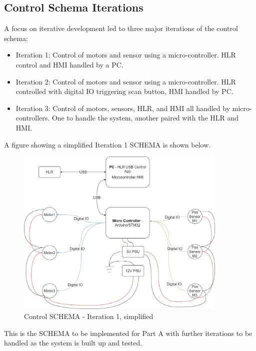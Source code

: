 \documentclass{UoNMCHA}
\numberwithin{equation}{section}
\begin{document}
\subsection{Control Schema Iterations}\label{sub:Control Schema Iterations}
A focus on iterative development led to three major iterations of the control schema:
\begin{itemize}
	\item Iteration 1: Control of motors and sensor using a micro-controller. HLR control and HMI handled by a PC.
	\item Iteration 2: Control of motors and sensor using a micro-controller. HLR controlled with digital IO triggering scan button, HMI handled by PC.
	\item Iteration 3: Control of motors, sensors, HLR, and HMI all handled by micro-controllers. One to handle the system, another paired with the HLR and HMI.
\end{itemize}
A figure showing a simplified Iteration 1 SCHEMA is shown below.\\
\begin{figure}[H]
\centering
\includegraphics[width=0.9\textwidth]{FYP_SCHEMA_20221020_simplified.jpg}
\caption{Control SCHEMA - Iteration 1, simplified}
\label{fig:Iteraion 1}
\end{figure}
This is the SCHEMA to be implemented for Part A with further iterations to be handled as the system is built up and tested.\\
\end{document}
